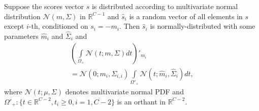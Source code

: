 \documentclass[nohyperref]{article}
\theoremstyle{plain}
\theoremstyle{definition}
\theoremstyle{remark}
\begin{document}
\newpage
\begin{manualtheorem}{4.3}
\label{theor:app-grad}
Suppose the scores vector $s$ is distributed according to multivariate normal distribution $\mathcal{N}(m, \Sigma)$ in $\mathbb{R}^{C-1}$ and $\hat s_i$ is a random vector of all elements in $s$ except $i$-th, conditioned on $s_i = -m_i$. Then $\hat s_i$ is normally-distributed with some parameters $\hat m_i$ and $\hat \Sigma_i$ and
\begin{multline}
    \left(\int\limits_{\Omega_+}\mathcal{N}(t; m, \Sigma) dt\right)'_{m_i} \\  = \mathcal{N}(0;m_i, \Sigma_{i, i})
    \int\limits_{\Omega'_+}\mathcal{N}(t; \hat m_i, \hat \Sigma_i) dt,
    \label{eq:app-exact-grad}
\end{multline}
where $\mathcal{N}(t; \mu, \Sigma)$ denotes multivariate normal PDF and $\Omega'_+: \{t \in \mathbb{R}^{C-2}, t_i \ge 0, i = \overline{1,C-2}\}$ is an orthant in $\mathbb{R}^{C-2}$.
\end{manualtheorem}
\end{document}
